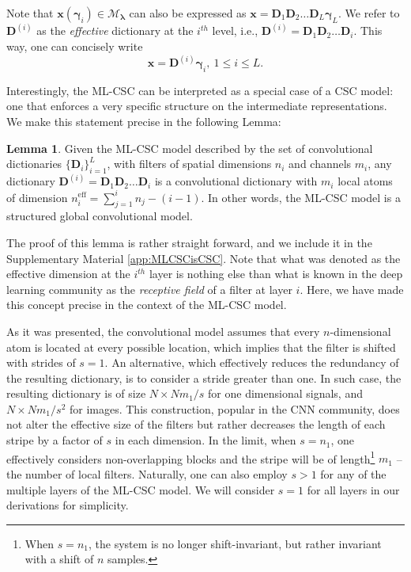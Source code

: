\documentclass[10pt,journal]{IEEEtran}
\def\x{{\mathbf x}}
\def\D{{\mathbf D}}
\def\M{{\mathcal{M}}}
\def\gama{{\boldsymbol \gamma}}
\def\lamda{{\boldsymbol \lambda}}
\theoremstyle{plain}
\theoremstyle{definition}
\newtheorem{lemma}{Lemma}
\begin{document}
Note that $\x(\gama_i) \in \M_\lamda$ can also be expressed as $\x = \D_1\D_2\dots\D_L \gama_L$. We refer to $\D^{(i)}$ as the \emph{effective} dictionary at the $i^{th}$ level, i.e., $\D^{(i)} = \D_1\D_2\dots\D_i$. This way, one can concisely write
\begin{equation}
	\x = \D^{(i)}\gama_i, \ 1\leq i\leq L.
\end{equation}

Interestingly, the ML-CSC can be interpreted as a special case of a CSC model: one that enforces a very specific structure on the intermediate representations. We make this statement precise in the following Lemma:

\begin{lemma}{} \label{lemma:MLCSCisCSC}
	Given the ML-CSC model described by the set of convolutional dictionaries $\{\D_i\}_{i=1}^L$, with filters of spatial dimensions $n_i$ and channels $m_i$, any dictionary $\D^{(i)} = \D_1 \D_2 \dots \D_i$ is a convolutional dictionary with $m_i$ local atoms of dimension $n_i^{\text{eff}} = \sum_{j=1}^{i} n_j - (i-1)$. In other words, the ML-CSC model is a structured global convolutional model.
\end{lemma}
\noindent
The proof of this lemma is rather straight forward, and we include it in the Supplementary Material \ref{app:MLCSCisCSC}.
Note that what was denoted as the effective dimension at the $i^{th}$ layer is nothing else than what is known in the deep learning community as the \emph{receptive field} of a filter at layer $i$. Here, we have made this concept precise in the context of the ML-CSC model.

As it was presented, the convolutional model assumes that every $n$-dimensional atom is located at every possible location, which implies that the filter is shifted with strides of $s=1$. An alternative, which effectively reduces the redundancy of the resulting dictionary, is to consider a stride greater than one. In such case, the resulting dictionary is of size $N\times Nm_1/s$ for one dimensional signals, and $N\times N m_1 / s^2$ for images. This construction, popular in the CNN community, does not alter the effective size of the filters but rather decreases the length of each stripe by a factor of $s$ in each dimension. In the limit, when $s = n_1$, one effectively considers non-overlapping blocks and the stripe will be of length\footnote{When $s=n_1$, the system is no longer shift-invariant, but rather invariant with a shift of $n$ samples.} $m_1$ -- the number of local filters. Naturally, one can also employ $s>1$ for any of the multiple layers of the ML-CSC model. We will consider $s=1$ for all layers in our derivations for simplicity.
\end{document}
